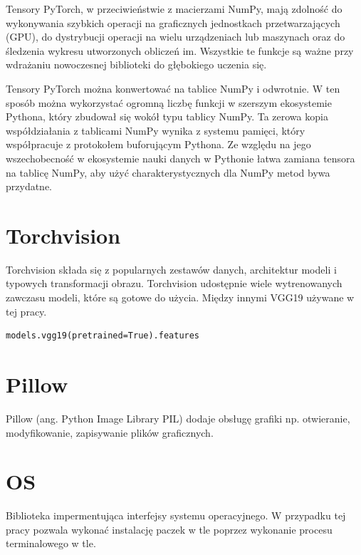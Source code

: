 \documentclass[brudnopis]{xmgr}
\begin{document}
Tensory PyTorch, w przeciwieństwie z macierzami NumPy, mają zdolność do wykonywania szybkich operacji na graficznych jednostkach przetwarzających (GPU), do dystrybucji operacji na wielu urządzeniach lub maszynach oraz do śledzenia wykresu utworzonych obliczeń im. Wszystkie te funkcje są ważne przy wdrażaniu nowoczesnej biblioteki do głębokiego uczenia się.


Tensory PyTorch można konwertować na tablice NumPy i odwrotnie. W ten sposób można wykorzystać ogromną liczbę funkcji w szerszym ekosystemie Pythona, który zbudował się wokół typu tablicy NumPy. Ta zerowa kopia współdziałania z tablicami NumPy wynika z systemu pamięci, który współpracuje z protokołem buforującym Pythona. 
Ze względu na jego wszechobecność w ekosystemie nauki danych w Pythonie łatwa zamiana tensora na tablicę NumPy, aby użyć charakterystycznych dla NumPy metod bywa przydatne.

    \section{Torchvision\label{s:dsssl}}
    
    Torchvision składa się z popularnych zestawów danych, architektur modeli i typowych transformacji obrazu. Torchvision udostępnie wiele wytrenowanych zawczasu modeli, które są gotowe do użycia. Między innymi VGG19 używane w tej pracy.
    
\begin{lstlisting}
models.vgg19(pretrained=True).features
\end{lstlisting}


\section{Pillow\label{s:dsssl}}
    
   Pillow (ang. Python Image Library PIL) dodaje obsługę grafiki np. otwieranie, modyfikowanie, zapisywanie plików graficznych.
   
    
\section{OS\label{s:dsssl}}
        
Biblioteka impermentująca  interfejsy systemu operacyjnego. W przypadku tej pracy pozwala wykonać instalację paczek w tle poprzez wykonanie procesu terminalowego w tle. 
\end{document}
